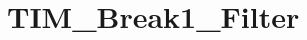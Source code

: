 \hypertarget{group___t_i_m___break1___filter}{\section{T\-I\-M\-\_\-\-Break1\-\_\-\-Filter}
\label{group___t_i_m___break1___filter}
}
